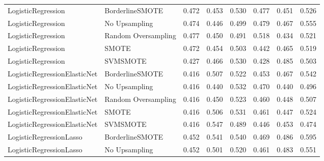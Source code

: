 \begin{tabular}{llllllll}
          LogisticRegression &     BorderlineSMOTE & 0.472 &                     0.453 &                 0.530 &                  0.477 &                                   0.451 &     0.526 \\
          LogisticRegression &       No Upsampling & 0.474 &                     0.446 &                 0.499 &                  0.479 &                                   0.467 &     0.555 \\
          LogisticRegression & Random Oversampling & 0.477 &                     0.450 &                 0.491 &                  0.518 &                                   0.434 &     0.521 \\
          LogisticRegression &               SMOTE & 0.472 &                     0.454 &                 0.503 &                  0.442 &                                   0.465 &     0.519 \\
          LogisticRegression &            SVMSMOTE & 0.427 &                     0.466 &                 0.530 &                  0.428 &                                   0.485 &     0.503 \\
LogisticRegressionElasticNet &     BorderlineSMOTE & 0.416 &                     0.507 &                 0.522 &                  0.453 &                                   0.467 &     0.542 \\
LogisticRegressionElasticNet &       No Upsampling & 0.416 &                     0.440 &                 0.532 &                  0.470 &                                   0.440 &     0.496 \\
LogisticRegressionElasticNet & Random Oversampling & 0.416 &                     0.450 &                 0.523 &                  0.460 &                                   0.448 &     0.507 \\
LogisticRegressionElasticNet &               SMOTE & 0.416 &                     0.506 &                 0.531 &                  0.461 &                                   0.447 &     0.524 \\
LogisticRegressionElasticNet &            SVMSMOTE & 0.416 &                     0.547 &                 0.489 &                  0.446 &                                   0.453 &     0.474 \\
     LogisticRegressionLasso &     BorderlineSMOTE & 0.452 &                     0.541 &                 0.540 &                  0.469 &                                   0.486 &     0.595 \\
     LogisticRegressionLasso &       No Upsampling & 0.452 &                     0.501 &                 0.520 &                  0.461 &                                   0.483 &     0.551 \\

\end{tabular}
